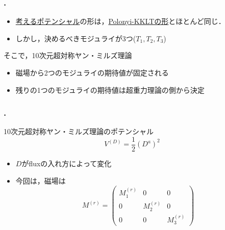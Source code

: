 \documentclass[
  a4paper,uplatex,dvipdfmx,10pt,
  xcolor = {dvipsnames,svgnames},
  hyperref ={colorlinks=true,citecolor=Navy,linkcolor=NavyBlue,urlcolor=purple}
]{beamer}
\begin{document}
\begin{frame}
  \frametitle{\thesection.\thesubsection\ \subsecname}
  \color{DarkMagenta}

  \begin{itemize}
    \color{DarkMagenta}
    \item 
    \hyperlink{potential_SUGRA}{考えるポテンシャル}の形は，\hyperlink{PE_Polonyi_KKLT}{Polonyi-KKLTの形}とほとんど同じ．

    \item 
    しかし，決めるべきモジュライが3つ($T_1,T_2,T_3$)
  \end{itemize}

  \vspace{10pt}

  \pause

  そこで，10次元超対称ヤン・ミルズ理論
  \begin{itemize}
    \color{DarkMagenta}
    \item 
    磁場から2つのモジュライの期待値が固定される
    \item 
    残りの1つのモジュライの期待値は超重力理論の側から決定
  \end{itemize}

\end{frame}

\begin{frame}
  \frametitle{\thesection.\thesubsection\ \subsecname}

  10次元超対称ヤン・ミルズ理論のポテンシャル
  \begin{equation}
    V^{(D)}
    =
    \frac{1}{2}(D^{a})^2
    \nonumber
  \end{equation}

  \vspace{10pt}

  \begin{itemize}
    \item 
    $D$がfluxの入れ方によって変化
    \item 
    今回は，磁場は
    \begin{equation}
      M^{(r)}
      =
      \begin{pmatrix}
        M_{1}^{(r)} & 0 & 0 \\
        0 & M_{2}^{(r)} & 0 \\
        0 & 0 & M_{3}^{(r)}
      \end{pmatrix}
      \nonumber
    \end{equation}
  \end{itemize}

\end{frame}
\end{document}
